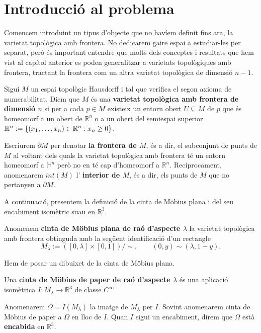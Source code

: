 \section{Introducció al problema}
Comencem introduint un tipus d'objecte que no havíem definit fins ara, la varietat topològica amb frontera. No dedicarem gaire espai a estudiar-les per separat, però és important entendre que molts dels conceptes i resultats que hem vist al capítol anterior es poden generalitzar a varietats topològiques amb frontera, tractant la frontera com un altra varietat topològica de dimensió $n-1$.
\begin{defi}\label{def:varietat_topologica_amb_frontera}
    Sigui $M$ un espai topològic Hausdorff i tal que verifica el segon axioma de numerabilitat. Diem que $M$ és una \textbf{varietat topològica amb frontera de dimensió $n$} si per a cada $p\in M$ existeix un entorn obert $U\subseteq M$ de $p$ que és homeomorf a un obert de $\mathbb R^n$ o a un obert del semiespai superior $\mathbb H^n := \{(x_1, \dots, x_n)\in\mathbb R^n:x_n\geq 0\}$. 
\end{defi}

\begin{nota}\label{nota:frontier_and_interior}
    Escriurem $\partial M$ per denotar \textbf{la frontera de $M$}, és a dir, el subconjunt de punts de $M$ al voltant dels quals la varietat topològica amb frontera té un entorn homeomorf a $\mathbb H^n$ però no en té cap d'homeomorf a $\mathbb R^n$. Recíprocament, anomenarem $int(M)$ l' \textbf{interior de $M$}, és a dir, els punts de $M$ que no pertanyen a $\partial M$.
\end{nota}

A continuació, presentem la definició de la cinta de Möbius plana i del seu encabiment isomètric suau en $\mathbb R^3$.
\begin{defi}
    Anomenem \textbf{cinta de Möbius plana de raó d'aspecte $\lambda$} la varietat topològica amb frontera obtinguda amb la següent identificació d'un rectangle
    $$M_\lambda := ([0,\lambda] \times [0,1])/\sim, \quad\quad (0,y)\sim(\lambda,1-y).$$
\end{defi}
{\color{blue} Hem de posar un dibuixet de la cinta de Möbius plana.}

\begin{defi}\label{def:cinta_mobius_paper}
    Una \textbf{cinta de Möbius de paper de raó d'aspecte $\lambda$} és una aplicació isomètrica $I:M_{\lambda}\to\mathbb R^3$ de classe $C^\infty$
\end{defi}
\begin{nota}
    Anomenarem $\Omega=I(M_\lambda)$ la imatge de $M_\lambda$ per $I$. Sovint anomenarem cinta de Möbius de paper a $\Omega$ en lloc de $I$. Quan $I$ sigui un encabiment, direm que $\Omega$ està \textbf{encabida} en $\mathbb R^3$.
\end{nota}

